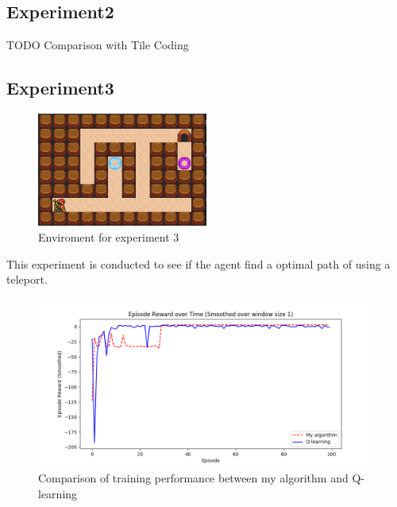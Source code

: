 
\subsection{Experiment2}

TODO Comparison with Tile Coding
\newpage
\subsection{Experiment3}

\begin{figure}[!htb]
\centering
\includegraphics[width=0.5\textwidth]{./figures/experiment3_v2}
\caption{Enviroment for experiment 3}
\label{experiment3}
\end{figure}

This experiment is conducted to see if the agent find a optimal path of using a teleport. 

\begin{figure}[!htb]
\centering
\includegraphics[width=1.0\textwidth]{./figures/experiment3_training}
\caption{Comparison of training performance between my algorithm and Q-learning}
\label{experiment3_training}
\end{figure}

